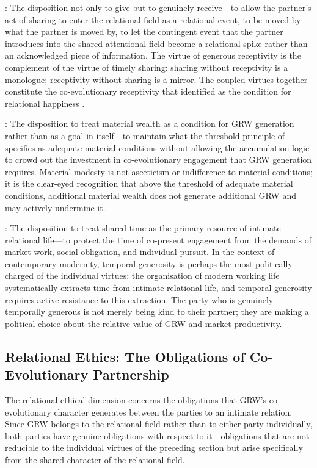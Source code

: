 : The disposition not only to give but to genuinely receive---to allow the partner's act of sharing to enter the relational field as a relational event, to be moved by what the partner is moved by, to let the contingent event that the partner introduces into the shared attentional field become a relational spike rather than an acknowledged piece of information. The virtue of generous receptivity is the complement of the virtue of timely sharing: sharing without receptivity is a monologue; receptivity without sharing is a mirror. The coupled virtues together constitute the co-evolutionary receptivity that  identified as the condition for relational happiness \parencite{paperxiv}.

: The disposition to treat material wealth as a condition for GRW generation rather than as a goal in itself---to maintain what the threshold principle of  specifies as adequate material conditions without allowing the accumulation logic to crowd out the investment in co-evolutionary engagement that GRW generation requires. Material modesty is not asceticism or indifference to material conditions; it is the clear-eyed recognition that above the threshold of adequate material conditions, additional material wealth does not generate additional GRW and may actively undermine it.

: The disposition to treat shared time as the primary resource of intimate relational life---to protect the time of co-present engagement from the demands of market work, social obligation, and individual pursuit. In the context of contemporary modernity, temporal generosity is perhaps the most politically charged of the individual virtues: the organisation of modern working life systematically extracts time from intimate relational life, and temporal generosity requires active resistance to this extraction. The party who is genuinely temporally generous is not merely being kind to their partner; they are making a political choice about the relative value of GRW and market productivity.

\subsection{Relational Ethics: The Obligations of Co-Evolutionary Partnership}
\label{p15:subsec:relational_ethics}

\noindent
The relational ethical dimension concerns the obligations that GRW's co-evolutionary character generates between the parties to an intimate relation. Since GRW belongs to the relational field rather than to either party individually, both parties have genuine obligations with respect to it---obligations that are not reducible to the individual virtues of the preceding section but arise specifically from the shared character of the relational field.

